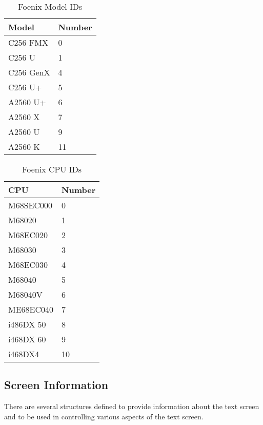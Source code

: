 \begin{table}
	\begin{center}
		\begin{tabular}{|l|l|} \hline
			Model & Number \\ \hline\hline
			C256 FMX & 0 \\ \hline
			C256 U & 1 \\ \hline
			C256 GenX & 4 \\ \hline
			C256 U+ & 5 \\ \hline
			A2560 U+ & 6 \\ \hline
			A2560 X & 7 \\ \hline
			A2560 U & 9 \\ \hline
			A2560 K & 11 \\ \hline
		\end{tabular}
	\end{center}
	\caption{Foenix Model IDs}
	\label{tbl:fnx_model_ids}
\end{table}

\begin{table}
	\begin{center}
		\begin{tabular}{|l|l|} \hline
			CPU & Number \\ \hline\hline
			M68SEC000 & 0 \\ \hline
			M68020 & 1 \\ \hline
			M68EC020 & 2 \\ \hline
			M68030 & 3 \\ \hline
			M68EC030 & 4 \\ \hline
			M68040 & 5 \\ \hline
			M68040V & 6 \\ \hline
			ME68EC040 & 7 \\ \hline
			i486DX 50 & 8 \\ \hline
			i468DX 60 & 9 \\ \hline
			i468DX4 & 10 \\ \hline
		\end{tabular}
	\end{center}
	\caption{Foenix CPU IDs}
	\label{tbl:fnx_cpu_ids}
\end{table}

\subsection*{Screen Information}
There are several structures defined to provide information about the text screen and to be used in controlling various aspects
of the text screen.


